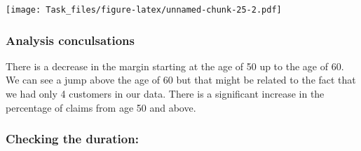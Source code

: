 \documentclass[]{article}
\newenvironment{Shaded}{\begin{snugshade}}{\end{snugshade}}
\newcommand{\KeywordTok}[1]{\textcolor[rgb]{0.13,0.29,0.53}{\textbf{#1}}}
\newcommand{\DataTypeTok}[1]{\textcolor[rgb]{0.13,0.29,0.53}{#1}}
\newcommand{\StringTok}[1]{\textcolor[rgb]{0.31,0.60,0.02}{#1}}
\newcommand{\OperatorTok}[1]{\textcolor[rgb]{0.81,0.36,0.00}{\textbf{#1}}}
\newcommand{\NormalTok}[1]{#1}
\begin{document}
\begin{Shaded}
\end{Shaded}

\texttt{[image: Task\_files/figure-latex/unnamed-chunk-25-2.pdf]}

\subsubsection{Analysis conculsations}\label{analysis-conculsations-2}

There is a decrease in the margin starting at the age of 50 up to the
age of 60. We can see a jump above the age of 60 but that might be
related to the fact that we had only 4 customers in our data. There is a
significant increase in the percentage of claims from age 50 and above.

\subsubsection{Checking the duration:}\label{checking-the-duration}
\end{document}

